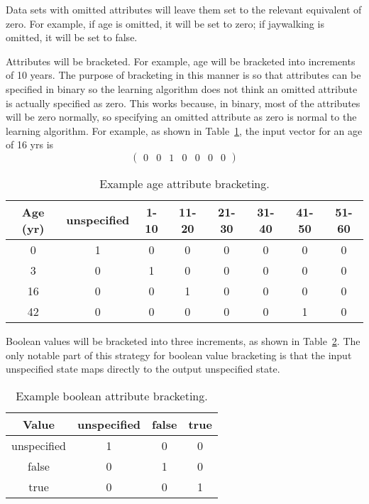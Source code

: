 \documentclass{article}
\begin{document}
Data sets with omitted attributes will leave them set to the relevant equivalent of zero. For example, if age is omitted, it will be set to zero; if jaywalking is omitted, it will be set to false.

Attributes will be bracketed. For example, age will be bracketed into increments of 10 years. The purpose of bracketing in this manner is so that attributes can be specified in binary so the learning algorithm does not think an omitted attribute is actually specified as zero. This works because, in binary, most of the attributes will be zero normally, so specifying an omitted attribute as zero is normal to the learning algorithm. For example, as shown in Table~\ref{tab:example_age_attribute_bracketing}, the input vector for an age of 16 yrs is
$$
\begin{pmatrix}
    0 & 0 & 1 & 0 & 0 & 0 & 0
\end{pmatrix}
$$

\begin{table}[h]
    \centering
    \begin{tabular}{c|c|c|c|c|c|c|c}
        Age (yr) & unspecified & 1-10 & 11-20 & 21-30 & 31-40 & 41-50 & 51-60 \\\hline
        0 & 1 & 0 & 0 & 0 & 0 & 0 & 0 \\
        3 & 0 & 1 & 0 & 0 & 0 & 0 & 0 \\
        16 & 0 & 0 & 1 & 0 & 0 & 0 & 0 \\
        42 & 0 & 0 & 0 & 0 & 0 & 1 & 0
    \end{tabular}
    \caption{Example age attribute bracketing.}
    \label{tab:example_age_attribute_bracketing}
\end{table}

Boolean values will be bracketed into three increments, as shown in Table~\ref{tab:example_boolean_attribute_bracketing}. The only notable part of this strategy for boolean value bracketing is that the input unspecified state maps directly to the output unspecified state.

\begin{table}[h]
    \centering
    \begin{tabular}{c|c|c|c}
        Value & unspecified & false & true \\\hline
        unspecified & 1 & 0 & 0 \\
        false & 0 & 1 & 0 \\
        true & 0 & 0 & 1
    \end{tabular}
    \caption{Example boolean attribute bracketing.}
    \label{tab:example_boolean_attribute_bracketing}
\end{table}
\end{document}
